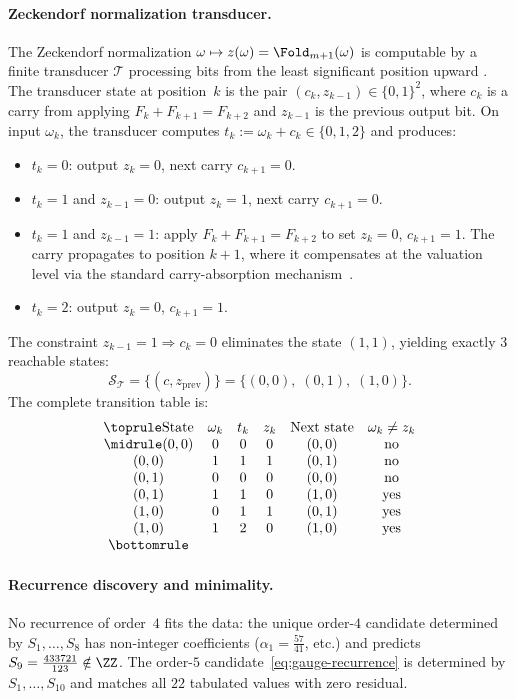 \paragraph{Zeckendorf normalization transducer.}
The Zeckendorf normalization $\omega\mapsto z(\omega)=\Fold_{m+1}(\omega)$ is computable by a finite transducer $\mathcal{T}$ processing bits from the least significant position upward \cite{Frougny1992}. The transducer state at position~$k$ is the pair $(c_k,z_{k-1})\in\{0,1\}^2$, where $c_k$ is a carry from applying $F_{k}+F_{k+1}=F_{k+2}$ and $z_{k-1}$ is the previous output bit. On input $\omega_k$, the transducer computes $t_k:=\omega_k+c_k\in\{0,1,2\}$ and produces:
\begin{itemize}[itemsep=1pt,leftmargin=*]
\item $t_k=0$: output $z_k=0$, next carry $c_{k+1}=0$.
\item $t_k=1$ and $z_{k-1}=0$: output $z_k=1$, next carry $c_{k+1}=0$.
\item $t_k=1$ and $z_{k-1}=1$: apply $F_k+F_{k+1}=F_{k+2}$ to set $z_k=0$, $c_{k+1}=1$. The carry propagates to position $k{+}1$, where it compensates at the valuation level via the standard carry-absorption mechanism~\cite{Frougny1992}.
\item $t_k=2$: output $z_k=0$, $c_{k+1}=1$.
\end{itemize}
The constraint $z_{k-1}=1\Rightarrow c_k=0$ eliminates the state $(1,1)$, yielding exactly $3$ reachable states:
\begin{equation}\label{eq:transducer-states}
\mathcal{S}_{\mathcal{T}}=\bigl\{(c,z_{\mathrm{prev}})\bigr\}=\{(0,0),\;(0,1),\;(1,0)\}.
\end{equation}
The complete transition table is:
\[
\begin{array}{cccccc}
\toprule
\text{State} & \omega_k & t_k & z_k & \text{Next state} & \omega_k\neq z_k \\
\midrule
(0,0) & 0 & 0 & 0 & (0,0) & \text{no} \\
(0,0) & 1 & 1 & 1 & (0,1) & \text{no} \\
(0,1) & 0 & 0 & 0 & (0,0) & \text{no} \\
(0,1) & 1 & 1 & 0 & (1,0) & \text{yes} \\
(1,0) & 0 & 1 & 1 & (0,1) & \text{yes} \\
(1,0) & 1 & 2 & 0 & (1,0) & \text{yes} \\
\bottomrule
\end{array}
\]

\paragraph{Recurrence discovery and minimality.}
No recurrence of order~$4$ fits the data: the unique order-$4$ candidate determined by $S_1,\ldots,S_8$ has non-integer coefficients ($\alpha_1=\tfrac{57}{41}$, etc.) and predicts $S_9=\tfrac{433721}{123}\notin\ZZ$. The order-$5$ candidate~\eqref{eq:gauge-recurrence} is determined by $S_1,\ldots,S_{10}$ and matches all $22$ tabulated values with zero residual.


